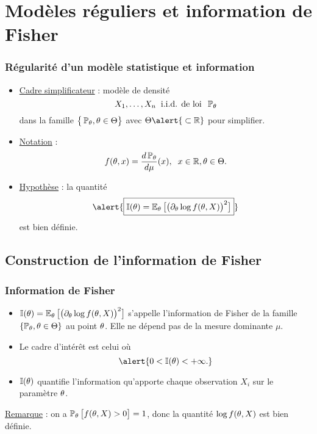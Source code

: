 \section{Modèles réguliers et information de Fisher}

\begin{frame}
\frametitle{Régularité d'un modèle statistique et information}
\begin{itemize}
\item \underline{Cadre simplificateur} : modèle de densité
$$X_1,\ldots, X_n\;\;\text{i.i.d. de loi}\;\; \operatorname{{\mathbb P}}_\theta$$
dans la famille $\big\{\operatorname{{\mathbb P}}_\theta, \theta \in \Theta\big\}$ avec $\Theta \alert{\; \subset \R}$ pour simplifier.
\item \underline{Notation} :
$$f(\theta, x) = \frac{d\operatorname{{\mathbb P}}_\theta}{d\mu}(x),\;\;x\in \operatorname{{\mathbb R}},\theta \in \Theta.$$
\item \underline{\alert{Hypothèse}} : la quantité
$$\alert{\boxed{{\mathbb I}(\truetheta) = \E_\truetheta\big[\big(\partial_\truetheta \log f(\truetheta, X)\big)^2\big]}}$$
est bien définie.
\end{itemize}
\end{frame}

\subsection{Construction de l'information de Fisher}

\begin{frame}
\frametitle{Information de Fisher}
\begin{df}
\begin{itemize}
\item $\mathbb{I}(\theta) = \operatorname{{\mathbb E}}_\theta\big[\big(\partial_\theta \log f(\theta, X)\big)^2\big]$ s'appelle \alert{l'information de Fisher} de la famille $\{\operatorname{{\mathbb P}}_\theta,\theta \in \Theta\}$ au point $\theta$. Elle ne dépend pas de la mesure dominante $\mu$.
\item Le cadre d'intérêt est celui où
$$\alert{0 < \mathbb{I}(\truetheta)< +\infty.}$$
\item $\mathbb{I}(\theta)$ quantifie \og l'information \fg{} qu'apporte chaque observation $X_i$ sur le paramètre $\theta$.
\end{itemize}
\end{df}
\underline{Remarque} : on a $\operatorname{{\mathbb P}}_\theta\big[f(\theta, X)>0\big]=1$, donc la quantité $\log f(\theta, X)$ est bien définie.
\end{frame}

